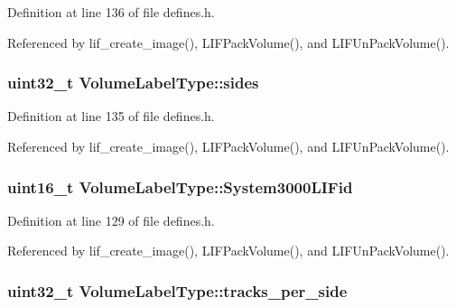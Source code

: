 Definition at line 136 of file defines.\+h.



Referenced by lif\+\_\+create\+\_\+image(), L\+I\+F\+Pack\+Volume(), and L\+I\+F\+Un\+Pack\+Volume().

\subsubsection[{\texorpdfstring{sides}{sides}}]{\setlength{\rightskip}{0pt plus 5cm}uint32\+\_\+t Volume\+Label\+Type\+::sides}\hypertarget{structVolumeLabelType_ac1e0f088685c022ec1974cb6fa4d255c}{}\label{structVolumeLabelType_ac1e0f088685c022ec1974cb6fa4d255c}


Definition at line 135 of file defines.\+h.



Referenced by lif\+\_\+create\+\_\+image(), L\+I\+F\+Pack\+Volume(), and L\+I\+F\+Un\+Pack\+Volume().

\subsubsection[{\texorpdfstring{System3000\+L\+I\+Fid}{System3000LIFid}}]{\setlength{\rightskip}{0pt plus 5cm}uint16\+\_\+t Volume\+Label\+Type\+::\+System3000\+L\+I\+Fid}\hypertarget{structVolumeLabelType_a08ea76c4d6e860804d6cfd24174d301f}{}\label{structVolumeLabelType_a08ea76c4d6e860804d6cfd24174d301f}


Definition at line 129 of file defines.\+h.



Referenced by lif\+\_\+create\+\_\+image(), L\+I\+F\+Pack\+Volume(), and L\+I\+F\+Un\+Pack\+Volume().

\subsubsection[{\texorpdfstring{tracks\+\_\+per\+\_\+side}{tracks_per_side}}]{\setlength{\rightskip}{0pt plus 5cm}uint32\+\_\+t Volume\+Label\+Type\+::tracks\+\_\+per\+\_\+side}\hypertarget{structVolumeLabelType_a590051c8debbe3d157761235c0e80d79}{}\label{structVolumeLabelType_a590051c8debbe3d157761235c0e80d79}


